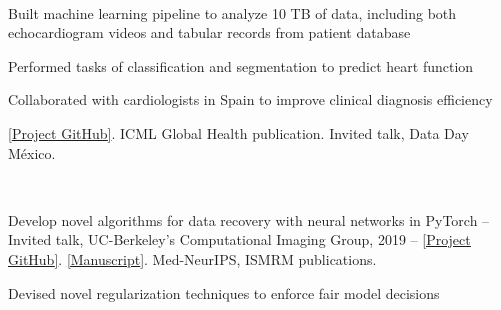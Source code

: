 \documentclass[]{deedy-resume-openfont}
\begin{document}
\begin{minipage}[t]{0.68\textwidth}
\\
\vspace{\topsep}
\vspace{-4mm}
\begin{tightemize}
\item Built machine learning pipeline to analyze 10 TB of data, including both echocardiogram videos and tabular records from patient database
\item Performed tasks of classification and segmentation to predict heart function
\item Collaborated with cardiologists in Spain to improve clinical diagnosis efficiency
\item \href{https://github.com/dssg/usal_echo_public}{[\underline{Project GitHub}]}. ICML Global Health publication. Invited talk, Data Day México. 
\end{tightemize}
\sectionsep

\\
\vspace{\topsep} 
\vspace{-4mm}
\begin{tightemize}
\item Develop novel algorithms for data recovery with neural networks in PyTorch
    \subitem -- Invited talk, UC-Berkeley's Computational Imaging Group, 2019
    \subitem -- \href{http://www.github.com/davevanveen/compsensing\_dip}{[\underline{Project GitHub}]}. \href{http://www.arxiv.org/pdf/1806.06438.pdf}{[\underline{Manuscript}]}. Med-NeurIPS, ISMRM publications.
\item Devised novel regularization techniques to enforce fair model decisions %
\end{tightemize}
\sectionsep


\end{minipage}
\end{document}
